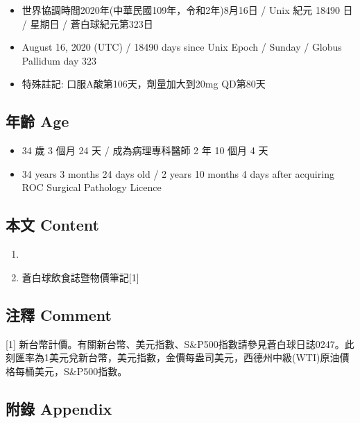 \documentclass[a5paper, 11pt
]{book}
\providecommand{\tightlist}{%
  \setlength{\itemsep}{0pt}\setlength{\parskip}{0pt}}
\begin{document}
\begin{itemize}
\tightlist
\item
  世界協調時間2020年(中華民國109年，令和2年)8月16日 / Unix 紀元 18490 日
  / 星期日 / 蒼白球紀元第323日
\item
  August 16, 2020 (UTC) / 18490 days since Unix Epoch / Sunday / Globus
  Pallidum day 323
\item
  特殊註記: 口服A酸第106天，劑量加大到20mg QD第80天
\end{itemize}

\hypertarget{ux5e74ux9f61-age-76}{%
\subsection{年齡 Age}\label{ux5e74ux9f61-age-76}}

\begin{itemize}
\tightlist
\item
  34 歲 3 個月 24 天 / 成為病理專科醫師 2 年 10 個月 4 天
\item
  34 years 3 months 24 days old / 2 years 10 months 4 days after
  acquiring ROC Surgical Pathology Licence
\end{itemize}

\hypertarget{ux672cux6587-content-76}{%
\subsection{本文 Content}\label{ux672cux6587-content-76}}

\begin{enumerate}
\def\labelenumi{\arabic{enumi}.}
\tightlist
\item
\item
  蒼白球飲食誌暨物價筆記{[}1{]}
\end{enumerate}

\hypertarget{ux6ce8ux91cb-comment-76}{%
\subsection{注釋 Comment}\label{ux6ce8ux91cb-comment-76}}

{[}1{]}
新台幣計價。有關新台幣、美元指數、S\&P500指數請參見蒼白球日誌0247。此刻匯率為1美元兌新台幣，美元指數，金價每盎司美元，西德州中級(WTI)原油價格每桶美元，S\&P500指數。

\hypertarget{ux9644ux9304-appendix-76}{%
\subsection{附錄 Appendix}\label{ux9644ux9304-appendix-76}}
\end{document}
